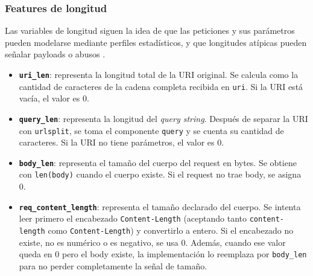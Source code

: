 \documentclass[12pt,oneside]{report}
\begin{document}
\subsubsection{Features de longitud}
Las variables de longitud siguen la idea de que las peticiones y sus parámetros pueden modelarse mediante perfiles estadísticos, y que longitudes atípicas pueden señalar payloads o abusos \cite{kruegel_vigna_2003,ingham_inoue_2007}.
\begin{itemize}[leftmargin=*]
  \item \textbf{\texttt{uri\_len}}: representa la longitud total de la URI original. Se calcula como la cantidad de caracteres de la cadena completa recibida en \texttt{uri}. Si la URI está vacía, el valor es 0.

  \item \textbf{\texttt{query\_len}}: representa la longitud del \textit{query string}. Después de separar la URI con \texttt{urlsplit}, se toma el componente \texttt{query} y se cuenta su cantidad de caracteres. Si la URI no tiene parámetros, el valor es 0.

  \item \textbf{\texttt{body\_len}}: representa el tamaño del cuerpo del request en bytes. Se obtiene con \texttt{len(body)} cuando el cuerpo existe. Si el request no trae body, se asigna 0.

  \item \textbf{\texttt{req\_content\_length}}: representa el tamaño declarado del cuerpo. Se intenta leer primero el encabezado \texttt{Content-Length} (aceptando tanto \texttt{content-length} como \texttt{Content-Length}) y convertirlo a entero. Si el encabezado no existe, no es numérico o es negativo, se usa 0. Además, cuando ese valor queda en 0 pero el body existe, la implementación lo reemplaza por \texttt{body\_len} para no perder completamente la señal de tamaño.
\end{itemize}
\end{document}
